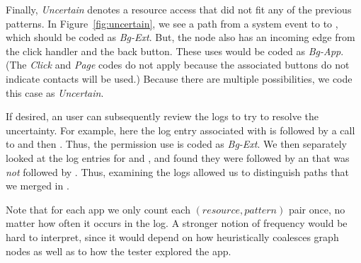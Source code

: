 Finally, \emph{Uncertain} denotes a resource access that did not fit any
of the previous patterns. In Figure~\ref{fig:uncertain}, we see a
path from a system event to  to ,
which should be coded as \emph{Bg-Ext}. But, the  node also 
has an incoming edge from the click handler and the back button.
These uses would be coded as \emph{Bg-App}.
(The \emph{Click} and \emph{Page} codes do not apply 
because the associated buttons do not indicate contacts will be used.)
Because there are multiple possibilities, we code this case as \emph{Uncertain}.

If desired, an \apptracer{} user can subsequently review the logs to
try to resolve the 
uncertainty. For example, here the log entry associated with 
 is followed by a call to
 and then . Thus, the permission
use is coded as \emph{Bg-Ext}. We then separately looked at the log
entries for  and , and found they
were followed by an  that was \emph{not} followed by
. Thus, examining the logs allowed us to
distinguish paths that we merged in \apptracer{}.


Note that for each app we only count each $(\textit{resource},
\textit{pattern})$ pair once, no matter how often it occurs in the log.
A stronger notion of frequency would be hard to interpret, since it would
depend on how \apptracer{} heuristically coalesces graph nodes as well as 
to how the tester explored the app.

 

